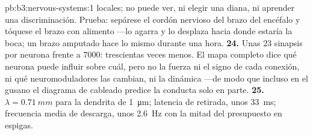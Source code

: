 \begin{solution}{pb:b3:nervous-systems:1}
locales; no puede ver, ni elegir una diana, ni aprender una
discriminación. Prueba: sepárese el cordón nervioso del brazo del
encéfalo y tóquese el brazo con alimento ---lo agarra y lo desplaza
hacia donde estaría la boca; un brazo amputado hace lo mismo durante
una hora.
\textbf{24.} Unas $23$ sinapsis por neurona frente a $7000$:
trescientas veces menos. El mapa completo dice qué neurona puede
influir sobre cuál, pero no la fuerza ni el signo de cada conexión, ni
qué neuromoduladores las cambian, ni la dinámica ---de modo que incluso
en el gusano el diagrama de cableado predice la conducta solo en parte.
\textbf{25.} $\lambda = \qty{0.71}{mm}$ para la dendrita de
\qty{1}{\micro m}; latencia de retirada, unos \qty{33}{ms}; frecuencia
media de descarga, unos \qty{2.6}{Hz} con la mitad del presupuesto en
espigas.
\end{solution}

